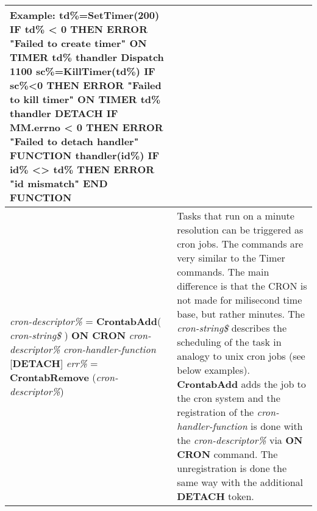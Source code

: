 \begin{table}[]
\begin{tabular}{|p{4cm}|p{10cm}|}
Example:\newline
td\%=\textbf{SetTimer}(200)\newline
\textbf{IF} td\% < 0 \textbf{THEN ERROR} "Failed to create timer"\newline
\textbf{ON TIMER} td\% thandler\newline
\textbf{Dispatch} 1100\newline
sc\%=\textbf{KillTimer}(td\%)\newline
\textbf{IF} sc\%<0 \textbf{THEN ERROR} "Failed to kill timer" \newline
\textbf{ON TIMER} td\% thandler \textbf{DETACH}\newline
\textbf{IF} MM.errno < 0 \textbf{THEN ERROR} "Failed to detach handler"\newline
\textbf{FUNCTION} thandler(id\%)\newline
\textbf{IF} id\% <> td\% \textbf{THEN ERROR} "id mismatch"\newline
\textbf{END FUNCTION}
\\ \hline
\textit{cron-descriptor\%} = \textbf{CrontabAdd}( \textit{cron-string\$} )\newline
\textbf{ON CRON} \textit{cron-descriptor\%} \textit{cron-handler-function} [\textbf{DETACH}]
\textit{err\%} = \textbf{CrontabRemove} (\textit{cron-descriptor\%})
& Tasks that run on a minute resolution can be triggered as cron jobs. The commands are very similar to the Timer commands. The main difference is that the CRON is not made for milisecond time base, but rather minutes. The \textit{cron-string\$} describes the scheduling of the task in analogy to unix cron jobs (see below examples). \textbf{CrontabAdd} adds the job to the cron system and the registration of the \textit{cron-handler-function} is done with the \textit{cron-descriptor\%} via \textbf{ON CRON} command. The unregistration is done the same way with the additional \textbf{DETACH} token. 


\end{tabular}
\end{table}
